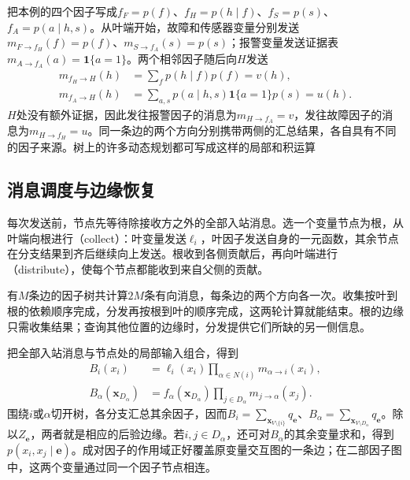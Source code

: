 把本例的四个因子写成$f_F=p(f)$、$f_H=p(h\mid f)$、$f_S=p(s)$、$f_A=p(a\mid h,s)$。从叶端开始，故障和传感器变量分别发送$m_{F\to f_H}(f)=p(f)$、$m_{S\to f_A}(s)=p(s)$；报警变量发送证据表$m_{A\to f_A}(a)=\mathbf{1}\{a=1\}$。两个相邻因子随后向$H$发送
\[
  \begin{aligned}
    m_{f_H\to H}(h)&=\sum_f p(h\mid f)p(f)=v(h),\\
    m_{f_A\to H}(h)&=\sum_{a,s}p(a\mid h,s)
       \mathbf{1}\{a=1\}p(s)=u(h).
  \end{aligned}
\]
$H$处没有额外证据，因此发往报警因子的消息为$m_{H\to f_A}=v$，发往故障因子的消息为$m_{H\to f_H}=u$。同一条边的两个方向分别携带两侧的汇总结果，各自具有不同的因子来源。树上的许多动态规划都可写成这样的局部和积运算

\subsection{消息调度与边缘恢复}
\label{sec:pgm-junction-tree-scheduling}

每次发送前，节点先等待除接收方之外的全部入站消息。选一个变量节点为根，从叶端向根进行（collect）：叶变量发送$\ell_i$，叶因子发送自身的一元函数，其余节点在分支结果到齐后继续向上发送。根收到各侧贡献后，再向叶端进行（distribute），使每个节点都能收到来自父侧的贡献。

有$M$条边的因子树共计算$2M$条有向消息，每条边的两个方向各一次。收集按叶到根的依赖顺序完成，分发再按根到叶的顺序完成，这两轮计算就能结束。根的边缘只需收集结果；查询其他位置的边缘时，分发提供它们所缺的另一侧信息。

把全部入站消息与节点处的局部输入组合，得到
\begin{equation}
  \begin{aligned}
    B_i(x_i)&=\ell_i(x_i)\prod_{\alpha\in N(i)}
       m_{\alpha\to i}(x_i),\\
    B_\alpha(\bm{x}_{D_\alpha})
      &=f_\alpha(\bm{x}_{D_\alpha})
        \prod_{j\in D_\alpha}m_{j\to\alpha}(x_j).
  \end{aligned}
  \label{eq:pgm-junction-tree-factor-beliefs}
\end{equation}
围绕$i$或$\alpha$切开树，各分支汇总其余因子，因而$B_i=\sum_{\bm{x}_{V\setminus\{i\}}}q_{\bm e}$、$B_\alpha=\sum_{\bm{x}_{V\setminus D_\alpha}}q_{\bm e}$。除以$Z_{\bm e}$，两者就是相应的后验边缘。若$i,j\in D_\alpha$，还可对$B_\alpha$的其余变量求和，得到$p(x_i,x_j\mid\bm e)$。成对因子的作用域正好覆盖原变量交互图的一条边；在二部因子图中，这两个变量通过同一个因子节点相连。

